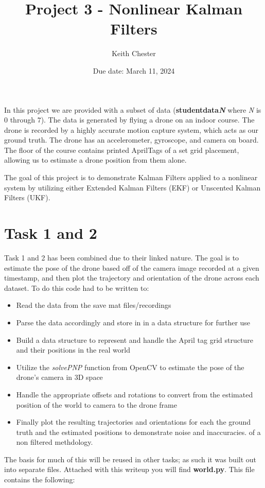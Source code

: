 \documentclass{article}
\title{Project 3 - Nonlinear Kalman Filters}
\author{Keith Chester}
\date{Due date: March 11, 2024}
\begin{document}
\maketitle

In this project we are provided with a subset of data (\textbf{studentdata\textit{N}} where \textit{N} is $0$ through $7$). The data is generated by flying a drone on an indoor course. The drone is recorded by a highly accurate motion capture system, which acts as our ground truth. The drone has an accelerometer, gyroscope, and camera on board. The floor of the course contains printed AprilTags of a set grid placement, allowing us to estimate a drone position from them alone.

The goal of this project is to demonstrate Kalman Filters applied to a nonlinear system by utilizing either Extended Kalman Filters (EKF) or Unscented Kalman Filters (UKF).

\section*{Task 1 and 2}

Task 1 and 2 has been combined due to their linked nature. The goal is to estimate the pose of the drone based off of the camera image recorded at a given timestamp, and then plot the trajectory and orientation of the drone across each dataset. To do this code had to be written to:

\begin{itemize}
    \item Read the data from the save mat files/recordings
    \item Parse the data accordingly and store in in a data structure for further use
    \item Build a data structure to represent and handle the April tag grid structure and their positions in the real world
    \item Utilize the \textit{solvePNP} function from OpenCV to estimate the pose of the drone's camera in 3D space
    \item Handle the appropriate offsets and rotations to convert from the estimated position of the world to camera to the drone frame
    \item Finally plot the resulting trajectories and orientations for each the ground truth and the estimated positions to demonstrate noise and inaccuracies. of a non filtered methdology.
\end{itemize}

The basis for much of this will be reused in other tasks; as such it was built out into separate files. Attached with this writeup you will find \textbf{world.py}. This file contains the following:
\end{document}
